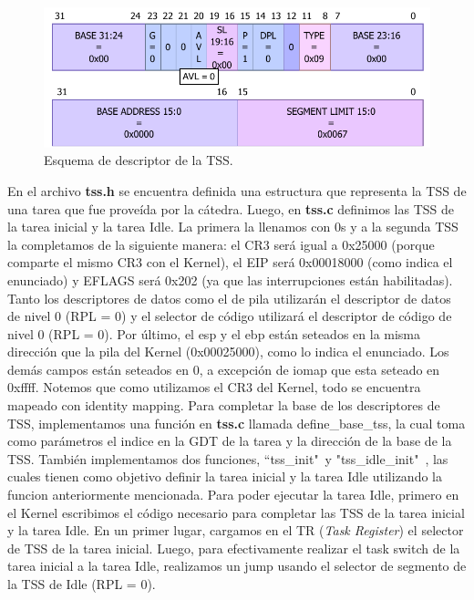\documentclass[a4paper]{article}
\begin{document}
\begin{figure}[h]
	\centering
	\includegraphics[scale=0.7]{img/TssdescriptorManual.pdf}
	\caption{Esquema de descriptor de la TSS.}
\end{figure}

\justify
En el archivo \textbf{tss.h} se encuentra definida una estructura que representa la TSS de una tarea que fue proveída por la cátedra. Luego, en \textbf{tss.c} definimos las TSS de la tarea inicial y la tarea Idle. La primera la llenamos con 0s y a la segunda TSS la completamos de la siguiente manera: el CR3 será igual a 0x25000 (porque comparte el mismo CR3 con el Kernel), el EIP será 0x00018000 (como indica el enunciado) y EFLAGS será 0x202 (ya que las interrupciones están habilitadas). Tanto los descriptores de datos como el de pila utilizarán el descriptor de datos de nivel 0 (RPL = 0) y el selector de código utilizará el descriptor de código de nivel 0 (RPL = 0). Por último, el esp y el ebp están seteados en la misma dirección que la pila del Kernel (0x00025000), como lo indica el enunciado. Los demás campos están seteados en 0, a excepción de iomap que esta seteado en 0xffff. Notemos que como utilizamos el CR3 del Kernel, todo se encuentra mapeado con identity mapping.
\justify
Para completar la base de los descriptores de TSS, implementamos una función en \textbf{tss.c} llamada define_base_tss, la cual toma como parámetros el indice en la GDT de la tarea y la dirección de la base de la TSS. También implementamos dos funciones, ``tss_init"\ y "tss_idle_init"\ , las cuales tienen como objetivo definir la tarea inicial y la tarea Idle utilizando la funcion anteriormente mencionada.
\justify
Para poder ejecutar la tarea Idle, primero en el Kernel escribimos el código necesario para completar las TSS de la tarea inicial y la tarea Idle. En un primer lugar, cargamos en el TR (\textit{Task Register}) el selector de TSS de la tarea inicial. Luego, para efectivamente realizar el task switch de la tarea inicial a la tarea Idle, realizamos un jump usando el selector de segmento de la TSS de Idle (RPL = 0).
\justify
\end{document}

